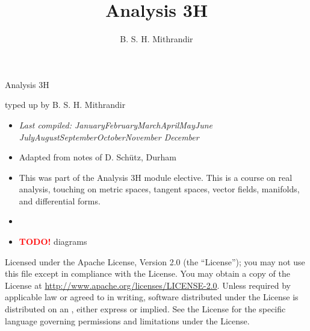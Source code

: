 \documentclass[letter-paper]{tufte-book}
\title{Analysis 3H}
\author[]{B. S. H. Mithrandir}
\newcommand{\monthyear}{%
  \ifcase\month\or January\or February\or March\or April\or May\or June\or
  July\or August\or September\or October\or November\or
  December\fi\space\number\year
}
\newcommand{\TODO}{\textcolor{red}{\bf TODO!}\xspace}
\begin{document}



\chapter*{}

\begin{fullwidth}

\par \begin{center}{\Huge Analysis 3H}\end{center}

\vspace*{5mm}

\par \begin{center}{\Large typed up by B. S. H. Mithrandir}\end{center}

\vspace*{5mm}

\begin{itemize}
  \item \textit{Last compiled: \monthyear}
  \item Adapted from notes of D. Sch\"utz, Durham
  \item This was part of the Analysis 3H module elective. This is a course on
  real analysis, touching on metric spaces, tangent spaces, vector fields,
  manifolds, and differential forms.
  \item[]
  \item \TODO diagrams
\end{itemize}

\par

\par Licensed under the Apache License, Version 2.0 (the ``License''); you may not
use this file except in compliance with the License. You may obtain a copy
of the License at \url{http://www.apache.org/licenses/LICENSE-2.0}. Unless
required by applicable law or agreed to in writing, software distributed
under the License is distributed on an , either express or implied. See the
License for the specific language governing permissions and limitations
under the License.
\end{fullwidth}
\end{document}
